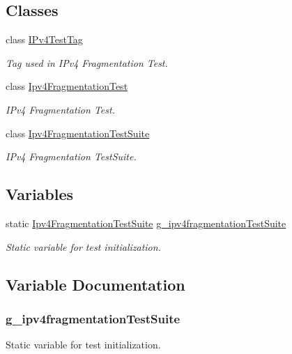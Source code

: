 \subsection*{Classes}
\begin{DoxyCompactItemize}
\item 
class \hyperlink{classIPv4TestTag}{I\+Pv4\+Test\+Tag}
\begin{DoxyCompactList}\small\item\em Tag used in I\+Pv4 Fragmentation Test. \end{DoxyCompactList}\item 
class \hyperlink{classIpv4FragmentationTest}{Ipv4\+Fragmentation\+Test}
\begin{DoxyCompactList}\small\item\em I\+Pv4 Fragmentation Test. \end{DoxyCompactList}\item 
class \hyperlink{classIpv4FragmentationTestSuite}{Ipv4\+Fragmentation\+Test\+Suite}
\begin{DoxyCompactList}\small\item\em I\+Pv4 Fragmentation Test\+Suite. \end{DoxyCompactList}\end{DoxyCompactItemize}
\subsection*{Variables}
\begin{DoxyCompactItemize}
\item 
static \hyperlink{classIpv4FragmentationTestSuite}{Ipv4\+Fragmentation\+Test\+Suite} \hyperlink{ipv4-fragmentation-test_8cc_a3beb788ce9380a8a6f17c7d1ec11ae70}{g\+\_\+ipv4fragmentation\+Test\+Suite}
\begin{DoxyCompactList}\small\item\em Static variable for test initialization. \end{DoxyCompactList}\end{DoxyCompactItemize}


\subsection{Variable Documentation}
\subsubsection[{\texorpdfstring{g\+\_\+ipv4fragmentation\+Test\+Suite}{g_ipv4fragmentationTestSuite}}]{ g\+\_\+ipv4fragmentation\+Test\+Suite\hspace{0.3cm}{\ttfamily [static]}}\hypertarget{ipv4-fragmentation-test_8cc_a3beb788ce9380a8a6f17c7d1ec11ae70}{}\label{ipv4-fragmentation-test_8cc_a3beb788ce9380a8a6f17c7d1ec11ae70}


Static variable for test initialization. 

